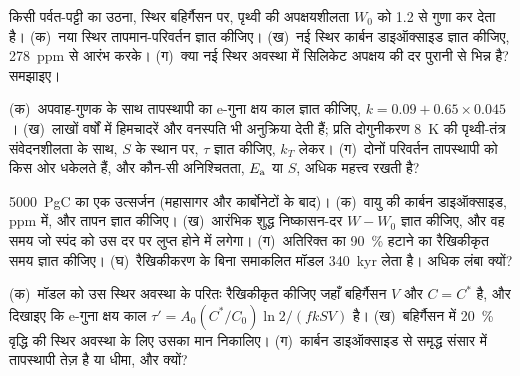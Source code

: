 \begin{exercise}[$\star\star$]\label{exo:b2:deep-time-climate:9}
किसी पर्वत-पट्टी का उठना, स्थिर बहिर्गैसन पर, पृथ्वी की अपक्षयशीलता $W_0$ को 1.2 से गुणा कर देता है।
(क)~नया स्थिर तापमान-परिवर्तन ज्ञात कीजिए। (ख)~नई स्थिर कार्बन डाइऑक्साइड ज्ञात कीजिए,
\qty{278}{ppm} से आरंभ करके। (ग)~क्या नई स्थिर अवस्था में सिलिकेट अपक्षय की दर पुरानी से भिन्न है?
समझाइए।
\end{exercise}

\begin{exercise}[$\star\star\star$]\label{exo:b2:deep-time-climate:10}
(क)~अपवाह-गुणक के साथ तापस्थापी का e-गुना क्षय काल ज्ञात कीजिए, $k = 0.09 + 0.65\times0.045$।
(ख)~लाखों वर्षों में हिमचादरें और वनस्पति भी अनुक्रिया देती हैं; प्रति दोगुनीकरण \qty{8}{K} की
पृथ्वी-तंत्र संवेदनशीलता के साथ, $S$ के स्थान पर, $\tau$ ज्ञात कीजिए, $k_T$ लेकर। (ग)~दोनों परिवर्तन तापस्थापी को
किस ओर धकेलते हैं, और कौन-सी अनिश्चितता, $E_{\text a}$ या $S$, अधिक महत्त्व रखती है?
\end{exercise}

\begin{exercise}[$\star\star\star$]\label{exo:b2:deep-time-climate:11}
\qty{5000}{PgC} का एक उत्सर्जन (महासागर और कार्बोनेटों के बाद)। (क)~वायु की कार्बन डाइऑक्साइड, \unit{ppm} में,
और तापन ज्ञात कीजिए। (ख)~आरंभिक शुद्ध निष्कासन-दर $W - W_0$ ज्ञात कीजिए, और वह समय जो
स्पंद को उस दर पर लुप्त होने में लगेगा। (ग)~अतिरिक्त का \qty{90}{\percent} हटाने का रैखिकीकृत समय ज्ञात कीजिए।
(घ)~रैखिकीकरण के बिना समाकलित मॉडल \qty{340}{kyr} लेता है। अधिक लंबा क्यों?
\end{exercise}

\begin{exercise}[$\star\star\star$]\label{exo:b2:deep-time-climate:12}
(क)~मॉडल को उस स्थिर अवस्था के परितः रैखिकीकृत कीजिए जहाँ बहिर्गैसन $V$ और $C = C^*$ है, और दिखाइए कि
e-गुना क्षय काल $\tau' = A_0 (C^*/C_0)\ln 2/(f k S V)$ है। (ख)~बहिर्गैसन में \qty{20}{\percent} वृद्धि की
स्थिर अवस्था के लिए उसका मान निकालिए। (ग)~कार्बन डाइऑक्साइड से समृद्ध संसार में तापस्थापी तेज़ है या धीमा,
और क्यों?
\end{exercise}

